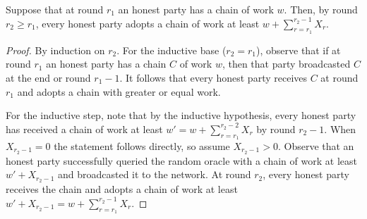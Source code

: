 %

\begin{lemma}
  Suppose that at round $r_1$ an honest party has a chain of work $w$.
  Then, by round $r_2 \geq r_1$, every honest party adopts a chain of work at least
  $w + \sum_{r = r_1}^{r_2 - 1}{X_r}$.
\end{lemma}
\begin{proof}
  By induction on $r_2$. For the inductive base ($r_2 = r_1$), observe that
  if at round $r_1$ an honest party has a chain $C$ of work $w$, then
  that party broadcasted $C$ at the end or round $r_1 - 1$. It follows that
  every honest party receives $C$ at round $r_1$ and adopts a chain with
  greater or equal work.

  For the inductive step, note that by the inductive hypothesis,
  every honest party has received a chain of work at least $w' = w + \sum_{r = r_1}^{r_2 - 2}{X_r}$
  by round $r_2 - 1$. When $X_{r_2 - 1} = 0$ the statement follows directly, so assume
  $X_{r_2 - 1} > 0$. Observe that an honest party successfully queried the random oracle
  with a chain of work at least $w' + X_{r_2 - 1}$ and broadcasted it to the network.
  At round $r_2$, every honest party receives the chain and adopts a chain
  of work at least $w' + X_{r_2 - 1} = w + \sum_{r = r_1}^{r_2 - 1}{X_r}$. \Qed
\end{proof}

